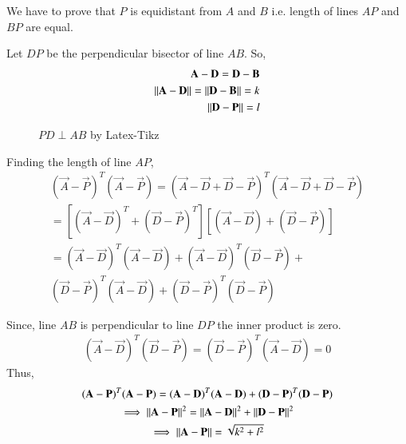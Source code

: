 
We have to prove that $P$ is equidistant from $A$ and $B$ i.e. length of lines $AP$ and $BP$ are equal. 

Let $DP$ be the perpendicular bisector of line $AB$. So,
\begin{align}
    \mathbf{A}-\mathbf{D} = \mathbf{D} - \mathbf{B} \\
    \left\lVert\mathbf{A}-\mathbf{D}\right\rVert = \left\lVert\mathbf{D} - \mathbf{B}\right\rVert = k \\
    \left\lVert\mathbf{D}-\mathbf{P}\right\rVert = l
\end{align}

\begin{figure}[!ht]
\centering
\resizebox{\columnwidth}{!}{}
\caption{$PD \perp AB$ by Latex-Tikz}
\label{fig:solutions/1/20/perp_bisector}
\end{figure}


Finding the length of line $AP$, 
\begin{multline}
    (\vec{A}-\vec{P})^T(\vec{A}-\vec{P}) = (\vec{A}- \vec{D}+\vec{D}-\vec{P})^T(\vec{A}-\vec{D}+\vec{D}-\vec{P}) \\
    =[(\vec{A}-\vec{D})^T+(\vec{D}-\vec{P})^T][(\vec{A}-\vec{D})+(\vec{D}-\vec{P})] \\
    =(\vec{A}-\vec{D})^T(\vec{A}-\vec{D}) + (\vec{A}-\vec{D})^T(\vec{D}-\vec{P}) + \\ (\vec{D}-\vec{P})^T(\vec{A}-\vec{D}) + (\vec{D}-\vec{P})^T(\vec{D}-\vec{P})
\end{multline}

Since, line $AB$ is perpendicular to line $DP$ the inner product is zero. 
\begin{align}
    (\vec{A}-\vec{D})^T(\vec{D}-\vec{P}) = (\vec{D}-\vec{P})^T(\vec{A}-\vec{D}) = 0
\end{align}
Thus, 
\begin{multline} \label{eq:solutions/1/20/len_ap}
    (\mathbf{A}-\mathbf{P})^T(\mathbf{A}-\mathbf{P}) = (\mathbf{A}-\mathbf{D})^T(\mathbf{A}-\mathbf{D}) + (\mathbf{D}-\mathbf{P})^T(\mathbf{D}-\mathbf{P}) \\
  \implies\left\lVert\mathbf{A}-\mathbf{P}\right\rVert^2 = \left\lVert\mathbf{A}-\mathbf{D}\right\rVert^2 + \left\lVert\mathbf{D}-\mathbf{P}\right\rVert^2 \\
  \implies\left\lVert\mathbf{A}-\mathbf{P}\right\rVert = \sqrt{k^2+l^2}
\end{multline}

